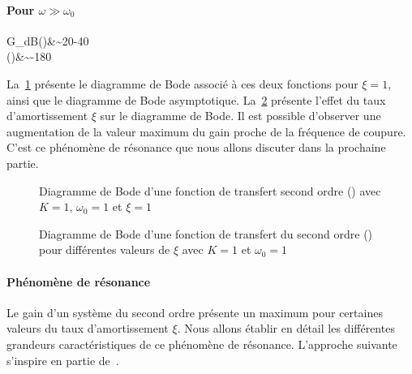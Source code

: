 \paragraph{Pour $\omega \gg\omega_0$}
\begin{bequation}
G_{dB}(\omega)&\sim20-40\log\omega\\
    \phi(\omega)&\sim-180\degreeSI
\end{bequation}
La~\cref{fig-bode_2nd_1} présente le diagramme de Bode associé à ces deux 
fonctions pour $\xi=1$, ainsi que le diagramme de Bode asymptotique. 
La~\cref{fig-bode_2nd_2} présente l'effet du taux d'amortissement $\xi$ sur 
le diagramme de Bode. Il est possible d'observer une augmentation de la valeur 
maximum du gain proche de la fréquence de coupure.
C'est ce phénomène de résonance que nous allons discuter dans la 
prochaine partie.
\begin{figure}[!t]
    \centering
    

    
    \caption{Diagramme de Bode d'une fonction de transfert second ordre 
    () avec $K=1$, $\omega_0=1$ et $\xi=1$
    \label{fig-bode_2nd_1}}
\end{figure}
\begin{figure}[!t]
    \centering
    
    \caption{Diagramme de Bode d'une fonction de transfert du second ordre 
             () pour différentes valeurs de $\xi$ avec 
             $K=1$ et $\omega_0=1$\label{fig-bode_2nd_2}}
\end{figure}
\afterpage{\clearpage}
\paragraph{Phénomène de résonance}
Le gain d'un système du second ordre présente un maximum pour certaines valeurs 
du taux d'amortissement $\xi$. Nous allons établir en détail les différentes 
grandeurs caractéristiques de ce phénomène de résonance. 
L'approche suivante s'inspire en partie de~\cite{laroche}.

